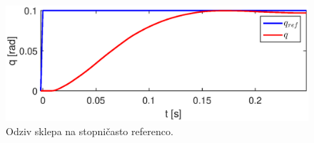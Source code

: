 \begin{figure}
	\centering
	\includegraphics[trim={0 0cm 0 0cm},scale=0.5]{./Slike/follow_step_vel_zoom.eps}
	\caption{Odziv sklepa na stopni\v{c}asto referenco.}
	\label{fig:follow_step_vel_zoom}
\end{figure}
